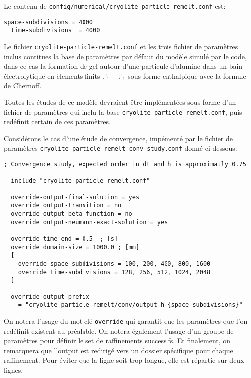 Le contenu de \texttt{config/numerical/cryolite-\-particle-\-remelt.conf} est:
\begin{lstlisting}[language={},frame=single,basicstyle=\ttfamily]
  space-subdivisions = 4000
  time-subdivisions  = 4000
\end{lstlisting}

Le fichier \texttt{cryolite-particle-remelt.conf} et les trois fichier
de param\`etres inclus contitues la base de param\`etres par d\'efaut
du mod\`ele simul\'e par le code, dans ce cas la formation de gel
autour d'une particule d'alumine dans un bain \'electrolytique en
\`elements finits $\mathbb P_1-\mathbb P_1$ sous forme enthalpique
avec la formule de Chernoff.

Toutes les \'etudes de ce mod\`ele devraient \^etre impl\'ement\'ees
sous forme d'un fichier de param\`etres qui inclu la base
\texttt{cryolite-particle-remelt.conf}, puis red\'efinit certain de
ces param\`etres.

Consid\'erons le cas d'une \'etude de convergence, imp\'ement\'e par
le fichier de param\`etres
\texttt{cryolite-\-particle-\-remelt-\-conv-\-study.conf} donn\'e ci-dessous:
\begin{lstlisting}[language={},frame=single,basicstyle=\ttfamily]
  ; Convergence study, expected order in dt and h is approximatly 0.75
  
  include "cryolite-particle-remelt.conf"
  
  override-output-final-solution = yes
  override output-transition = no
  override output-beta-function = no
  override output-neumann-exact-solution = yes

  override time-end = 0.5  ; [s]
  override domain-size = 1000.0 ; [mm]
  [
    override space-subdivisions = 100, 200, 400, 800, 1600
    override time-subdivisions = 128, 256, 512, 1024, 2048
  ]

  override output-prefix
    = "cryolite-particle-remelt/conv/output-h-{space-subdivisions}"
\end{lstlisting}

On notera l'usage du mot-cl\'e \texttt{override} qui garantit que les
param\`etres que l'on red\'efinit existent au pr\'ealable.
On notera \'egalement l'usage d'un groupe de param\`etres pour
d\'efinir le set de raffinements successifs. Et finalement, on
remarquera que l'output est redirig\'e vers un dossier sp\'ecifique
pour chaque raffinement. Pour \'eviter que la ligne soit trop longue,
elle est r\'epartie sur deux lignes.



